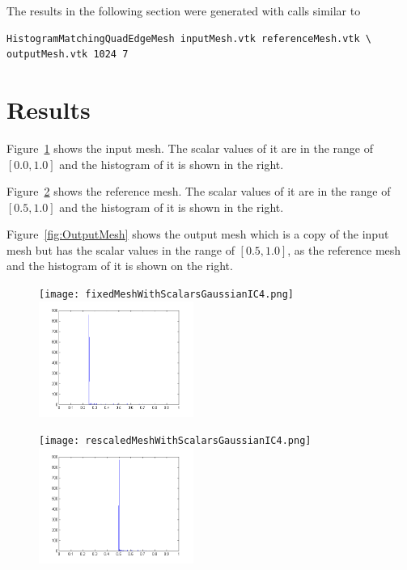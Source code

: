 \documentclass{InsightArticle}
\begin{document}
The results in the following section were generated with calls similar to

\begin{verbatim}
HistogramMatchingQuadEdgeMesh inputMesh.vtk referenceMesh.vtk \
outputMesh.vtk 1024 7
\end{verbatim}

\section{Results}
Figure~\ref{fig:InputMesh} shows the input mesh.
The scalar values of it are in the range of $[0.0, 1.0]$
and the histogram of it is shown in the right.

Figure~\ref{fig:ReferenceMesh} shows the reference mesh.
The scalar values of it are in the range of $[0.5, 1.0]$
and the histogram of it is shown in the right.

Figure~\ref{fig:OutputMesh} shows the output mesh which is a copy of the input mesh but
has the scalar values in the range of $[0.5, 1.0]$, as the reference mesh
and the histogram of it is shown on the right.

\begin{figure}
\center
\texttt{[image: fixedMeshWithScalarsGaussianIC4.png]}
\includegraphics[width=0.45\textwidth]{inputHistogram.png}
\label{fig:InputMesh}
\end{figure}

\begin{figure}
\center
\texttt{[image: rescaledMeshWithScalarsGaussianIC4.png]}
\includegraphics[width=0.45\textwidth]{refHistogram.png}
\label{fig:ReferenceMesh}
\end{figure}
\end{document}

